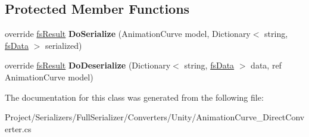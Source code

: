 \subsection*{Protected Member Functions}
\begin{DoxyCompactItemize}
\item 
\mbox{\label{class_full_serializer_1_1_internal_1_1_direct_converters_1_1_animation_curve___direct_converter_a1459e59a56a0729f37ec9cf9ced6cde9}} 
override \hyperlink{struct_full_serializer_1_1fs_result}{fs\+Result} {\bfseries Do\+Serialize} (Animation\+Curve model, Dictionary$<$ string, \hyperlink{class_full_serializer_1_1fs_data}{fs\+Data} $>$ serialized)
\item 
\mbox{\label{class_full_serializer_1_1_internal_1_1_direct_converters_1_1_animation_curve___direct_converter_ae2f2bd51a6e973292469f471a9978962}} 
override \hyperlink{struct_full_serializer_1_1fs_result}{fs\+Result} {\bfseries Do\+Deserialize} (Dictionary$<$ string, \hyperlink{class_full_serializer_1_1fs_data}{fs\+Data} $>$ data, ref Animation\+Curve model)
\end{DoxyCompactItemize}


The documentation for this class was generated from the following file\+:\begin{DoxyCompactItemize}
\item 
Project/\+Serializers/\+Full\+Serializer/\+Converters/\+Unity/Animation\+Curve\+\_\+\+Direct\+Converter.\+cs\end{DoxyCompactItemize}
